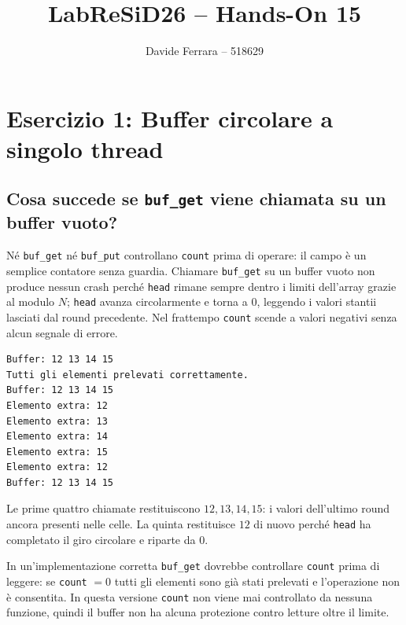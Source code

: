 \documentclass[a4paper,12pt]{article}
\title{LabReSiD26 -- Hands-On 15}
\author{Davide Ferrara -- 518629}
\date{}
\begin{document}
\maketitle

\section{Esercizio 1: Buffer circolare a singolo thread}

\subsection*{Cosa succede se \texttt{buf\_get} viene chiamata su un buffer vuoto?}

Né \texttt{buf\_get} né \texttt{buf\_put} controllano \texttt{count} prima
di operare: il campo è un semplice contatore senza guardia. Chiamare
\texttt{buf\_get} su un buffer vuoto non produce nessun crash perché
\texttt{head} rimane sempre dentro i limiti dell'array grazie al modulo
$N$; \texttt{head} avanza circolarmente e torna a $0$, leggendo i valori
stantii lasciati dal round precedente. Nel frattempo \texttt{count} scende
a valori negativi senza alcun segnale di errore.

\begin{lstlisting}[language=bash, caption={Cinque \texttt{buf\_get} extra su buffer vuoto}]
Buffer: 12 13 14 15
Tutti gli elementi prelevati correttamente.
Buffer: 12 13 14 15
Elemento extra: 12
Elemento extra: 13
Elemento extra: 14
Elemento extra: 15
Elemento extra: 12
Buffer: 12 13 14 15
\end{lstlisting}

Le prime quattro chiamate restituiscono $12, 13, 14, 15$: i valori
dell'ultimo round ancora presenti nelle celle. La quinta restituisce $12$
di nuovo perché \texttt{head} ha completato il giro circolare e riparte
da $0$.

In un'implementazione corretta \texttt{buf\_get} dovrebbe controllare
\texttt{count} prima di leggere: se \texttt{count} $= 0$ tutti gli
elementi sono già stati prelevati e l'operazione non è consentita.
In questa versione \texttt{count} non viene mai controllato da nessuna
funzione, quindi il buffer non ha alcuna protezione contro letture oltre
il limite.

\end{document}
